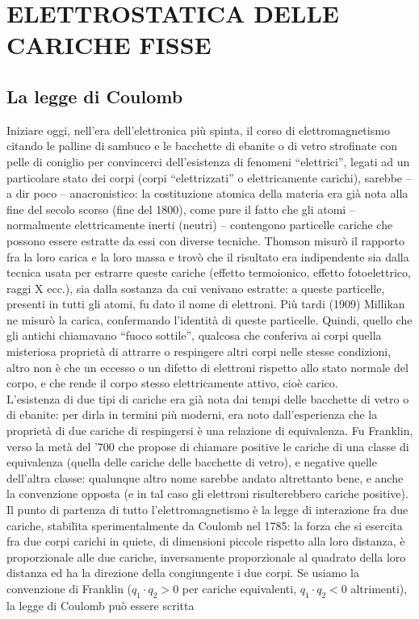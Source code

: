 \section{ELETTROSTATICA DELLE CARICHE FISSE}

\subsection{La legge di Coulomb}

Iniziare oggi, nell'era dell'elettronica più spinta, il corso di elettromagnetismo citando le palline di sambuco e le bacchette di ebanite o di vetro strofinate con pelle di coniglio per convincerci dell'esistenza di fenomeni ``elettrici'', legati ad un particolare stato dei corpi (corpi ``elettrizzati'' o elettricamente carichi), sarebbe -- a dir poco -- anacronistico: la costituzione atomica della materia era già nota alla fine del secolo scorso (fine del 1800), come pure il fatto che gli atomi -- normalmente elettricamente inerti (neutri) -- contengono particelle cariche che possono essere estratte da essi con diverse tecniche. Thomson misurò il rapporto fra la loro carica e la loro massa e trovò che il risultato era indipendente sia dalla tecnica usata per estrarre queste cariche (effetto termoionico, effetto fotoelettrico, raggi X ecc.), sia dalla sostanza da cui venivano estratte: a queste particelle, presenti in tutti gli atomi, fu dato il nome di elettroni. Più tardi (1909) Millikan ne misurò la carica, confermando l'identità di queste particelle. Quindi, quello che gli antichi chiamavano ``fuoco sottile'', qualcosa che conferiva ai corpi quella misteriosa proprietà di attrarre o respingere altri corpi nelle stesse condizioni, altro non è che un eccesso o un difetto di elettroni rispetto allo stato normale del corpo, e che rende il corpo stesso elettricamente attivo, cioè carico.\\
L'esistenza di due tipi di cariche era già nota dai tempi delle bacchette di vetro o di ebanite: per dirla in termini più moderni, era noto dall'esperienza che la proprietà di due cariche di respingersi è una relazione di equivalenza. Fu Franklin, verso la metà del '700 che propose di chiamare positive le cariche di una classe di equivalenza (quella delle cariche delle bacchette di vetro), e negative quelle dell'altra classe: qualunque altro nome sarebbe andato altrettanto bene, e anche la convenzione opposta (e in tal caso gli elettroni risulterebbero cariche positive).\\
Il punto di partenza di tutto l'elettromagnetismo è la legge di interazione fra due cariche, stabilita sperimentalmente da Coulomb nel 1785: la forza che si esercita fra due corpi carichi in quiete, di dimensioni piccole rispetto alla loro distanza, è proporzionale alle due cariche, inversamente proporzionale al quadrato della loro distanza ed ha la direzione della congiungente i due corpi. Se usiamo la convenzione di Franklin ($q_1\cdot q_2>0$ per cariche equivalenti, $q_1\cdot q_2<0$ altrimenti), la legge di Coulomb può essere scritta
